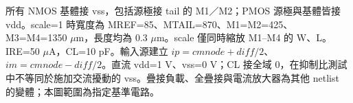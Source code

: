 \par
所有 NMOS 基體接 vss，包括源極接 tail 的 M1／M2；PMOS 源極與基體皆接 vdd。scale=1 時寬度為 MREF=85、MTAIL=870、M1=M2=425、M3=M4=1350 $\mu$m，長度均為 0.3 $\mu$m。scale 僅同時縮放 M1--M4 的 W、L。IRE=50 $\mu$A，CL=10 pF。輸入源建立 $ip=cmnode+diff/2$、$im=cmnode-diff/2$。直流 vdd=1 V、vss=0 V；CL 接全域 0，在抑制比測試中不等同於施加交流擾動的 vss。疊接負載、全疊接與電流放大器為其他 netlist 的變體；本圖範圍為指定基準電路。
